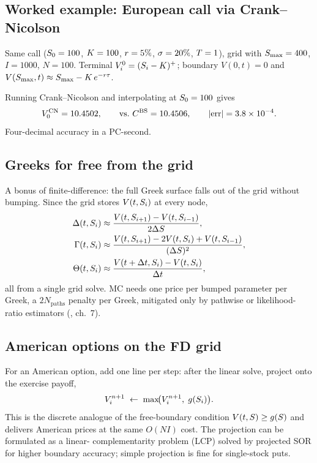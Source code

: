 \subsection{Worked example: European call via Crank--Nicolson}

Same call ($S_0=100$, $K=100$, $r=5\%$, $\sigma=20\%$,
$T=1$), grid with $S_{\max} = 400$, $I = 1000$, $N = 100$.
Terminal $V_i^0 = (S_i - K)^+$; boundary $V(0, t) = 0$ and
$V(S_{\max}, t) \approx S_{\max} - K\, e^{-r\tau}$.

Running Crank--Nicolson and interpolating at $S_0 = 100$ gives
\begin{equation}
  V^{\mathrm{CN}}_0 = 10.4502, \qquad
  \text{vs.}\ C^{\mathrm{BS}} = 10.4506,
  \qquad |{\mathrm{err}}| = 3.8\times 10^{-4}.
\end{equation}
Four-decimal accuracy in a PC-second.

\subsection{Greeks for free from the grid}

A bonus of finite-difference: the full Greek surface falls out of the
grid without bumping.  Since the grid stores $V(t, S_i)$ at every
node,
\begin{align}
  \Delta(t, S_i) &\approx
    \frac{V(t, S_{i+1}) - V(t, S_{i-1})}{2\Delta S}, \\
  \Gamma(t, S_i) &\approx
    \frac{V(t, S_{i+1}) - 2 V(t, S_i) + V(t, S_{i-1})}{(\Delta S)^2}, \\
  \Theta(t, S_i) &\approx
    \frac{V(t + \Delta t, S_i) - V(t, S_i)}{\Delta t},
\end{align}
all from a single grid solve.  MC needs one price per bumped parameter
per Greek, a $2 N_\text{paths}$ penalty per Greek, mitigated only
by pathwise or likelihood-ratio estimators (\citeGlasserman, ch.~7).

\subsection{American options on the FD grid}

For an American option, add one line per step: after the linear solve,
project onto the exercise payoff,
\begin{equation}
  V_i^{n+1} \;\leftarrow\; \max\!\bigl( V_i^{n+1},\; g(S_i) \bigr).
\end{equation}
This is the discrete analogue of the free-boundary condition
$V(t, S) \geq g(S)$ and delivers American prices at the same
$O(NI)$ cost.  The projection can be formulated as a linear-
complementarity problem (LCP) solved by projected SOR for higher
boundary accuracy; simple projection is fine for single-stock puts.

